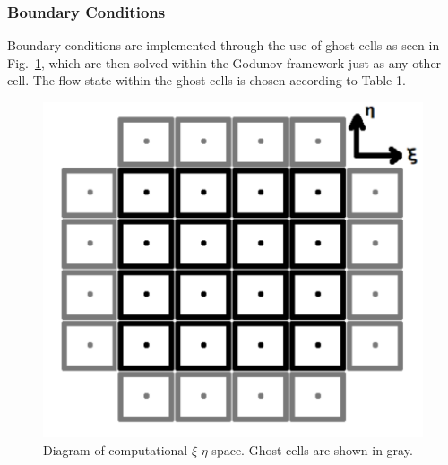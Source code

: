 \documentclass[12pt,letterpaper]{article}
\begin{document}

\subsubsection{Boundary Conditions}

Boundary conditions are implemented through the use of ghost cells as
seen in Fig.~\ref{fig:grid}, which are then solved within the Godunov
framework just as any other cell. The flow state within the ghost
cells is chosen according to Table 1.
\begin{figure}[htbp]
   \centering
   \includegraphics[width=.6\textwidth]{cell_centered_grid_with_ghost_points.pdf} 
   \caption[A Diagram of Computational $\xi$-$\eta$ Space]{Diagram of computational $\xi$-$\eta$ space. Ghost cells are shown in gray.}
   \label{fig:grid}
\end{figure}
\end{document}
